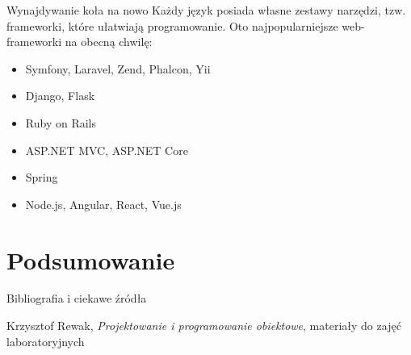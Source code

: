 \begin{frame}[fragile]{Wynajdywanie koła na nowo}
	Każdy język posiada własne zestawy narzędzi, tzw. frameworki, które ułatwiają programowanie. Oto najpopularniejsze web-frameworki na obecną chwilę:
	\begin{itemize}
		\item Symfony, Laravel, Zend, Phalcon, Yii
		\item Django, Flask
		\item Ruby on Rails
		\item ASP.NET MVC, ASP.NET Core
		\item Spring
		\item Node.js, Angular, React, Vue.js
	\end{itemize}
\end{frame}

\section{Podsumowanie}

\begin{frame}{Bibliografia i ciekawe źródła}
  
	\begin{thebibliography}{9}
	
		Krzysztof Rewak,
		\textit{Projektowanie i programowanie obiektowe},
		materiały do zajęć laboratoryjnych
	
	\end{thebibliography}

\end{frame}

